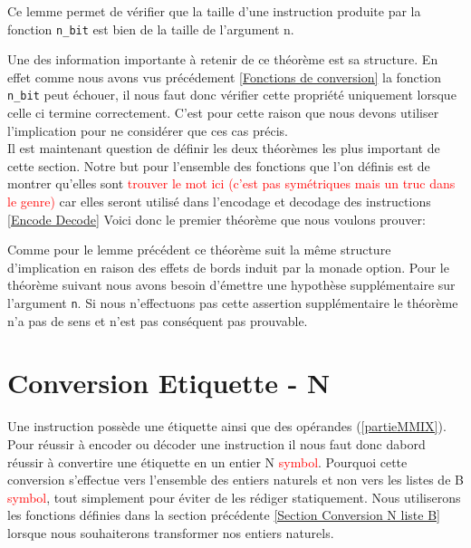 \documentclass {article}
\newcommand{\codefrom}[3]
           {}
\theoremstyle{definition}
\theoremstyle{remark}
\newcommand{\todo}[1]{\textcolor{red}{#1}}
\newcommand{\fun}[1]{\lstinline!#1!}
\begin{document}
Ce lemme permet de vérifier que la taille d'une instruction produite par
la fonction \fun{n_bit} est bien de la taille de l'argument n.


Une des information importante à retenir de ce théorème est sa structure.
En effet comme nous avons vus précédement \ref{Fonctions de conversion} la
fonction \fun{n_bit} peut échouer, il nous faut donc vérifier cette propriété
uniquement lorsque celle ci termine correctement. C'est pour cette raison
que nous devons utiliser l'implication pour ne considérer que ces cas précis. \\

Il est maintenant question de définir les deux théorèmes les plus important de
cette section. Notre but pour l'ensemble des fonctions que l'on définis est de
montrer qu'elles sont \todo{trouver le mot ici (c'est pas symétriques mais un truc dans le genre)}
car elles seront utilisé dans l'encodage et decodage des instructions \ref{Encode Decode}
Voici donc le premier théorème que nous voulons prouver:

\codefrom{src}{binary}{nbitn}

Comme pour le lemme précédent ce théorème suit la même structure d'implication en raison des effets
de bords induit par la monade option.
Pour le théorème suivant nous avons besoin d'émettre une hypothèse supplémentaire sur l'argument
\fun{n}. Si nous n'effectuons pas cette assertion supplémentaire le
théorème n'a pas de sens et n'est pas conséquent pas prouvable.

\codefrom{src}{binary}{bitnbit}





\section{Conversion Etiquette - N}
\label{partieOpcode}

Une instruction possède une étiquette ainsi que des opérandes (\ref{partieMMIX}).
Pour réussir à encoder ou décoder une instruction il nous faut donc dabord
réussir à convertire une étiquette en un entier N \todo{symbol}.
Pourquoi cette conversion s'effectue vers l'ensemble des entiers naturels
et non vers les listes de B \todo{symbol}, tout simplement pour éviter
de les rédiger statiquement. Nous utiliserons les fonctions définies dans
la section précédente \ref{Section Conversion N liste B} lorsque nous souhaiterons transformer nos entiers naturels.
\end{document}
